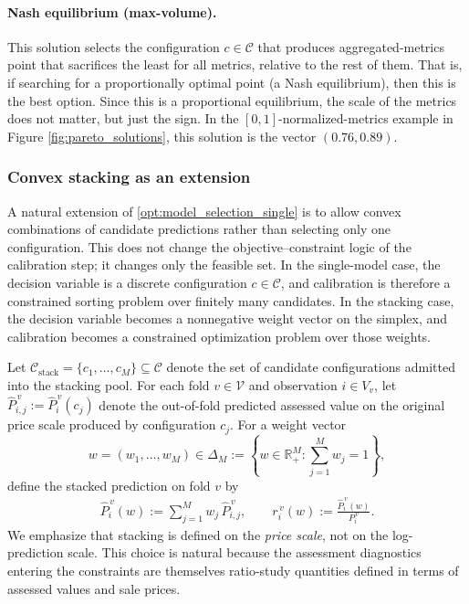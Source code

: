 \documentclass[12pt, draft]{article}
\theoremstyle{plain}
\theoremstyle{definition}
\newcommand{\1}{\mathbf{1}}
\newcommand{\C}{\mathcal{C}}
\begin{document}
{\paragraph{Nash equilibrium (max-volume).} This solution selects the configuration $c\in \C$ that produces aggregated-metrics point that sacrifices the least for all metrics, relative to the rest of them. That is, if searching for a proportionally optimal point (a Nash equilibrium), then this is the best option. Since this is a proportional equilibrium, the scale of the metrics does not matter, but just the sign. In the $[0,1]$-normalized-metrics example in Figure \ref{fig:pareto_solutions}, this solution is the vector $(0.76,0.89)$. 



\subsubsection{Convex stacking as an extension}
\label{subsubsec:convex_stacking}

A natural extension of \eqref{opt:model_selection_single} is to allow convex combinations of candidate predictions rather than selecting only one configuration. This does not change the objective--constraint logic of the calibration step; it changes only the feasible set. In the single-model case, the decision variable is a discrete configuration \(c\in\mathcal C\), and calibration is therefore a constrained sorting problem over finitely many candidates. In the stacking case, the decision variable becomes a nonnegative weight vector on the simplex, and calibration becomes a constrained optimization problem over those weights.

Let $\mathcal C_{\mathrm{stack}}=\{c_1,\dots,c_M\}\subseteq\mathcal C$ denote the set of candidate configurations admitted into the stacking pool. For each fold $v\in\mathcal V$ and observation $i\in V_v$, let
$
\hat P_{i,j}^{\,v}:=\hat P_i^{\,v}(c_j)
$
denote the out-of-fold predicted assessed value on the original price scale produced by configuration $c_j$. For a weight vector
\[
w=(w_1,\dots,w_M)\in\Delta_M
:=
\left\{
w\in\mathbb R_+^M : \sum_{j=1}^M w_j = 1
\right\},
\]
define the stacked prediction on fold $v$ by
\begin{align}
    \label{eq:stacked_prediction}
    \hat P_i^{\,v}(w)
    :=
    \sum_{j=1}^M w_j\,\hat P_{i,j}^{\,v},
    \qquad
    r_i^{\,v}(w)
    :=
    \frac{\hat P_i^{\,v}(w)}{P_i^{\,v}}.
\end{align}
We emphasize that stacking is defined on the \emph{price scale}, not on the log-prediction scale. This choice is natural because the assessment diagnostics entering the constraints are themselves ratio-study quantities defined in terms of assessed values and sale prices.

}
\end{document}
